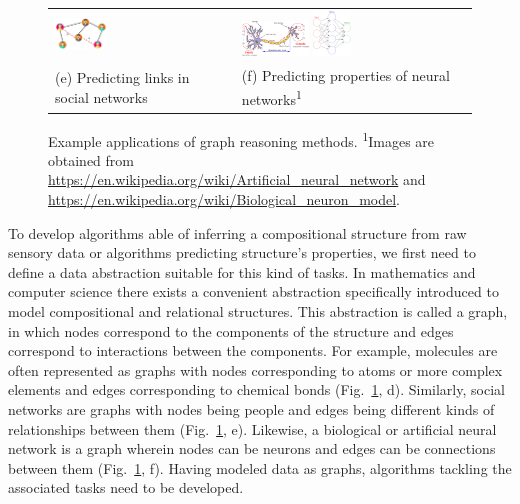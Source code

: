 \begin{figure}[tbhp]
\begin{tabular}{>{\centering\arraybackslash}p{}>{\centering\arraybackslash}p{}}
        \includegraphics[width=0.3\textwidth, align=c]{Ch1_Intro/fig1_c2.png} & \includegraphics[width=0.3\textwidth, align=c]{Ch1_Intro/Neuron3.png} \includegraphics[width=0.17\textwidth, align=c]{Ch1_Intro/Colored_neural_network.png} \\
        (e) Predicting links in social networks~\citep{zhou2020graph} & (f) Predicting properties of neural networks\textsuperscript{1} \\
        
    \end{tabular}
    \caption{\small Example applications of graph reasoning methods. \textsuperscript{1}Images are obtained from {\footnotesize \url{https://en.wikipedia.org/wiki/Artificial_neural_network}} and {\footnotesize \url{https://en.wikipedia.org/wiki/Biological_neuron_model}}.}
    \label{fig:intro_apps}
\end{figure}




To develop algorithms able of inferring a compositional structure from raw sensory data or algorithms predicting structure's properties, we first need to define a data abstraction suitable for this kind of tasks.
In mathematics and computer science there exists a convenient abstraction specifically introduced to model compositional and relational structures. This abstraction is called a graph, in which nodes correspond to the components of the structure and edges correspond to interactions between the components.
For example, molecules are often represented as graphs with nodes corresponding to atoms or more complex elements and edges corresponding to chemical bonds (Fig.~\ref{fig:intro_apps}, d). Similarly, social networks are graphs with nodes being people and edges being different kinds of relationships between them (Fig.~\ref{fig:intro_apps}, e). Likewise, a biological or artificial neural network is a graph wherein nodes can be neurons and edges can be connections between them (Fig.~\ref{fig:intro_apps}, f). 
Having modeled data as graphs, algorithms tackling the associated tasks need to be developed.


